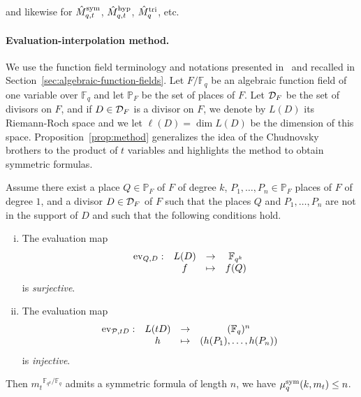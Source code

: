 \noindent and likewise for $\hat{M}^{\textrm{sym}}_{q,t}$, $\hat{M}^{\textrm{hyp}}_{q,t}$, $\hat{M}^{\textrm{tri}}_q$, etc.


\paragraph{Evaluation-interpolation method.}
We use the function field terminology and notations
presented in~\cite{Stichtenoth09} and recalled in
Section~\ref{sec:algebraic-function-fields}. Let $F/\mathbb{F}_q$ be an algebraic
function field of one variable over $\mathbb{F}_{q}$ and let $\mathbb{P}_F$ be the
set of places of $F$. Let $\mathcal{D}_F$ be the set of
divisors on $F$, and if $D\in\mathcal{D}_F$ is a divisor on
$F$, we denote by $L(D)$ its Riemann-Roch space and we let $\ell(D)=\dim L(D)$ be
the dimension of this space. Proposition~\ref{prop:method} generalizes the idea
of the Chudnovsky brothers to the product of $t$ variables and highlights the
method to obtain symmetric formulas.
\begin{prop}
  \label{prop:method}
  Assume there exist a place $Q\in\mathbb{P}_{F}$ of $F$ of degree $k$, $P_1,
  \dots, P_n\in\mathbb{P}_F$ places of $F$ of degree $1$, and a divisor
  $D\in\mathcal{D}_F$ of $F$ such that the places $Q$ and $P_1, \dots, P_n$ are not in
  the support of $D$ and such that the following conditions hold.
  \begin{enumerate}[(i)]
    \item \label{cond:1} The evaluation map
      \[
        \begin{array}{cccc}
        \operatorname{ev}_{Q, D}: & L(D) & \to & \mathbb{F}_{q^k}\\
  & f & \mapsto & f(Q)
\end{array}
\]
is \emph{surjective}.
    \item \label{cond:2} The evaluation map
      \[
        \begin{array}{cccc}
        \operatorname{ev}_{\mathcal{P}, tD}: & L(tD) & \to & (\mathbb{F}_{q})^n\\
  & h & \mapsto & (h(P_1), \dots, h(P_n))
\end{array}
\]
is \emph{injective}.
  \end{enumerate}
  Then ${m_t}^{\mathbb{F}_{q^k}/\mathbb{F}_q}$ admits a symmetric formula of length $n$, \ie we have $\mu^{\textrm{sym}}_q(k,m_t)\leq n$.
\end{prop}

